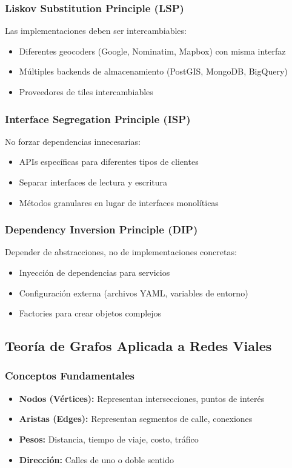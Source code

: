 \documentclass[11pt,a4paper]{article}
\begin{document}
\subsubsection{Liskov Substitution Principle (LSP)}
Las implementaciones deben ser intercambiables:
\begin{itemize}
    \item Diferentes geocoders (Google, Nominatim, Mapbox) con misma interfaz
    \item Múltiples backends de almacenamiento (PostGIS, MongoDB, BigQuery)
    \item Proveedores de tiles intercambiables
\end{itemize}

\subsubsection{Interface Segregation Principle (ISP)}
No forzar dependencias innecesarias:
\begin{itemize}
    \item APIs específicas para diferentes tipos de clientes
    \item Separar interfaces de lectura y escritura
    \item Métodos granulares en lugar de interfaces monolíticas
\end{itemize}

\subsubsection{Dependency Inversion Principle (DIP)}
Depender de abstracciones, no de implementaciones concretas:
\begin{itemize}
    \item Inyección de dependencias para servicios
    \item Configuración externa (archivos YAML, variables de entorno)
    \item Factories para crear objetos complejos
\end{itemize}

\subsection{Teoría de Grafos Aplicada a Redes Viales}

\subsubsection{Conceptos Fundamentales}
\begin{itemize}
    \item \textbf{Nodos (Vértices):} Representan intersecciones, puntos de interés
    \item \textbf{Aristas (Edges):} Representan segmentos de calle, conexiones
    \item \textbf{Pesos:} Distancia, tiempo de viaje, costo, tráfico
    \item \textbf{Dirección:} Calles de uno o doble sentido
\end{itemize}
\end{document}
